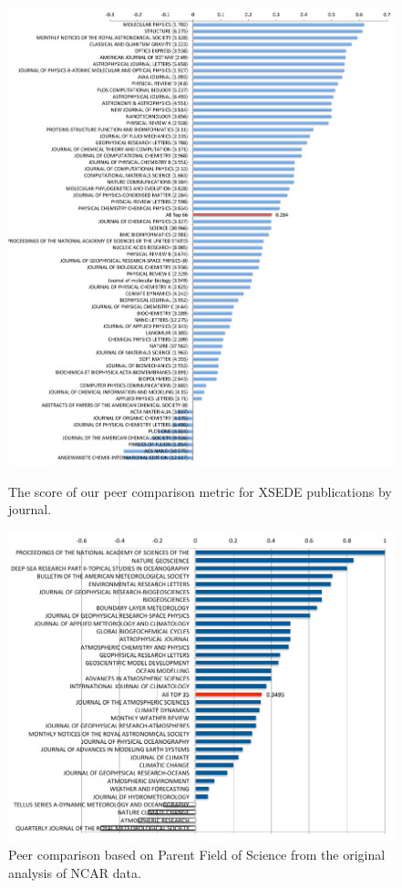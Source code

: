 \documentclass[10pt, conference, compsocconf]{IEEEtran}
\begin{document}
\begin{figure}[t!]
\includegraphics[width=.9\columnwidth]{images-new/xsede-journal-score.pdf} 
\vspace{-6pt}
\caption{The score of our peer comparison metric for XSEDE publications by journal.}\label{F:xsede-score}


  \centering 
    \includegraphics[width=1.0\columnwidth]{images-new/ncar-c.pdf} 
\vspace{-18pt}
  \caption{Peer comparison based on Parent Field of Science from the original analysis of NCAR data.}\label{F:ncar-score}
\end{figure} 
\end{document}
